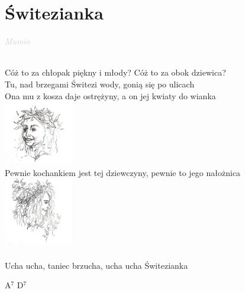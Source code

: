 \documentclass[a5paper, 10pt]{book}
\begin{document}
\section{Świtezianka}\textcolor{lightgray}{\textit{Mumio}}\\~\\
\begin{minipage}[t]{0.8\textwidth}
  Cóż to za chłopak piękny i młody? Cóż to za obok dziewica?\\
  Tu, nad brzegami Świtezi wody, gonią się po ulicach\\
  Ona mu z kosza daje ostrężyny, a on jej kwiaty do wianka\\
  \vspace*{10mm}\hspace*{10cm}\includegraphics[height=2.8cm]{switezianka.png}\vspace*{-3.2cm}\\
  Pewnie kochankiem jest tej dziewczyny, pewnie to jego nałożnica\\
  \hspace*{8.5cm}\includegraphics[height=3cm]{switezianka2.png}\vspace*{-3.1cm}\\
  \\
  \hspace*{5mm}Ucha ucha, taniec brzucha, ucha ucha Świtezianka\\
\end{minipage}
\begin{minipage}[t]{0.2\textwidth}
  A$^7$ D$^7$\\

\end{minipage}

\newpage
\end{document}
